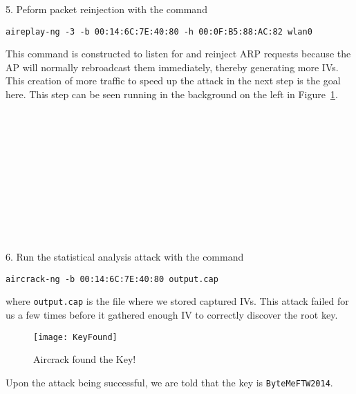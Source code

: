 \documentclass[12pt]{article}
\begin{document}
5. Peform packet reinjection with the command
\begin{center}
\texttt{aireplay-ng -3 -b 00:14:6C:7E:40:80 -h 00:0F:B5:88:AC:82 wlan0}
\end{center}
This command is constructed to listen for and reinject ARP requests because the AP will normally rebroadcast them immediately, thereby generating more IVs.  This creation of more traffic to speed up the attack in the next step is the goal here.  This step can be seen running in the background on the left in Figure~\ref{fig:keyfnd}.
\\\\\\\\\\\\\\\\\\\\\\\\

6. Run the statistical analysis attack with the command
\begin{center}
\texttt{aircrack-ng -b 00:14:6C:7E:40:80 output.cap}
\end{center}
where \texttt{output.cap} is the file where we stored captured IVs.  This attack failed for us a few times before it gathered enough IV to correctly discover the root key.

\begin{figure} [h]
\centering
\texttt{[image: KeyFound]}
\caption{Aircrack found the Key!}
\label{fig:keyfnd}
\end{figure}

Upon the attack being successful, we are told that the key is \texttt{ByteMeFTW2014}.

\newpage
\end{document}
